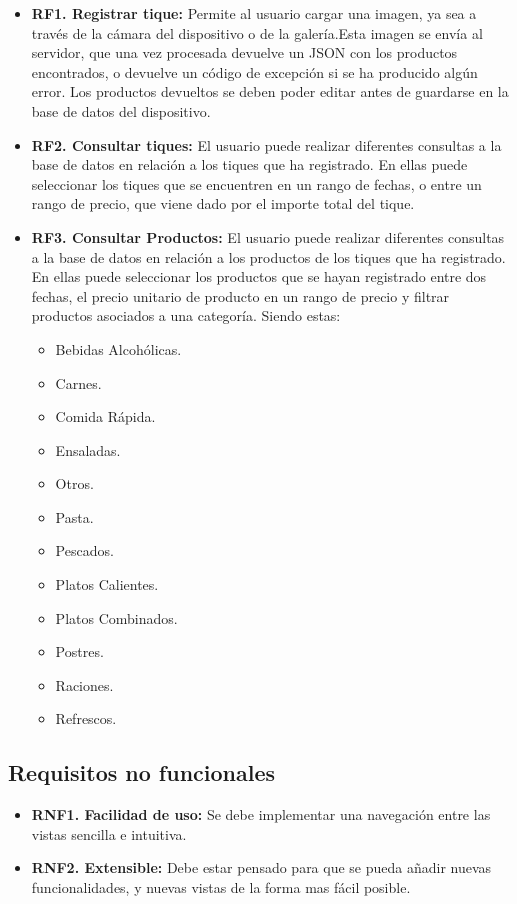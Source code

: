 \begin{itemize}
	\item \textbf{RF1. Registrar tique: }Permite al usuario cargar una imagen, ya sea a través de la cámara del dispositivo o de la galería.Esta imagen se envía al servidor, que una vez procesada devuelve un JSON con los productos encontrados, o devuelve un código de excepción si se ha producido algún error. Los productos devueltos se deben poder editar antes de guardarse en la base de datos del dispositivo.
	\item \textbf{RF2. Consultar tiques: }El usuario puede realizar diferentes consultas a la base de datos en relación a los tiques que ha registrado. En ellas puede seleccionar los tiques que se encuentren en un rango de fechas, o entre un rango de precio, que viene dado por el importe total del tique.
	\item \textbf{RF3. Consultar Productos: }El usuario puede realizar diferentes consultas a la base de datos en relación a los productos de los tiques que ha registrado. En ellas puede seleccionar los productos que se hayan registrado entre dos fechas, el precio unitario de producto en un rango de precio y filtrar productos asociados a una categoría. Siendo estas:
	\begin{itemize}
		\item Bebidas Alcohólicas.
		\item Carnes.
		\item Comida Rápida.
		\item Ensaladas.
		\item Otros.
		\item Pasta.
		\item Pescados.
		\item Platos Calientes.
		\item Platos Combinados.
		\item Postres.
		\item Raciones.
		\item Refrescos.
	\end{itemize}
\end{itemize}

\subsection{Requisitos no funcionales}

\begin{itemize}
	\item \textbf{RNF1. Facilidad de uso: } Se debe implementar una navegación entre las vistas sencilla e intuitiva.
	\item \textbf{RNF2. Extensible: } Debe estar pensado para que se pueda añadir nuevas funcionalidades, y nuevas vistas de la forma mas fácil posible.
\end{itemize}




